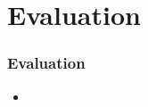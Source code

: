 \section{Evaluation}

\begin{frame}
	\frametitle{Evaluation}
	\begin{itemize}
		\item
	\end{itemize}
\end{frame}
